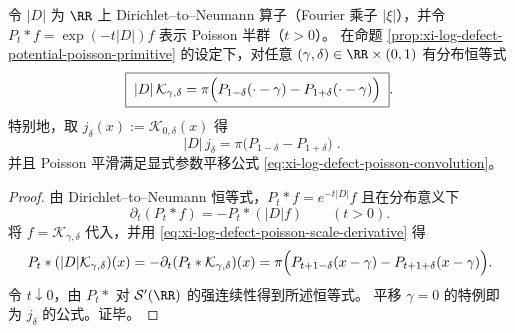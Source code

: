 \begin{proposition}\label{prop:xi-dtn-acts-on-jensen-kernel}
令 \(|D|\) 为 \(\RR\) 上 Dirichlet--to--Neumann 算子（Fourier 乘子 \(|\xi|\)），并令 \(P_t*f=\exp(-t|D|)f\) 表示 Poisson 半群（\(t>0\)）。
在命题 \ref{prop:xi-log-defect-potential-poisson-primitive} 的设定下，对任意 \((\gamma,\delta)\in\RR\times(0,1)\) 有分布恒等式
\[
\boxed{\;
|D|\,\mathcal{K}_{\gamma,\delta}
=\pi\Bigl(P_{1-\delta}(\cdot-\gamma)-P_{1+\delta}(\cdot-\gamma)\Bigr)\; }.
\]
特别地，取 \(j_\delta(x):=\mathcal{K}_{0,\delta}(x)\) 得
\[
\boxed{\;
|D|\,j_\delta
=\pi\bigl(P_{1-\delta}-P_{1+\delta}\bigr)\; }.
\]
并且 Poisson 平滑满足显式参数平移公式 \eqref{eq:xi-log-defect-poisson-convolution}。
\end{proposition}
\begin{proof}
由 Dirichlet--to--Neumann 恒等式，\(P_t*f=e^{-t|D|}f\) 且在分布意义下
\[
\partial_t(P_t*f)=-P_t*(|D|f)\qquad(t>0).
\]
将 \(f=\mathcal{K}_{\gamma,\delta}\) 代入，并用 \eqref{eq:xi-log-defect-poisson-scale-derivative} 得
\[
P_t*(|D|\mathcal{K}_{\gamma,\delta})(x)
=-\partial_t(P_t*\mathcal{K}_{\gamma,\delta})(x)
=\pi\Bigl(P_{t+1-\delta}(x-\gamma)-P_{t+1+\delta}(x-\gamma)\Bigr).
\]
令 \(t\downarrow 0\)，由 \(P_t*\) 对 \(\mathcal{S}'(\RR)\) 的强连续性得到所述恒等式。
平移 \(\gamma=0\) 的特例即为 \(j_\delta\) 的公式。证毕。
\end{proof}

